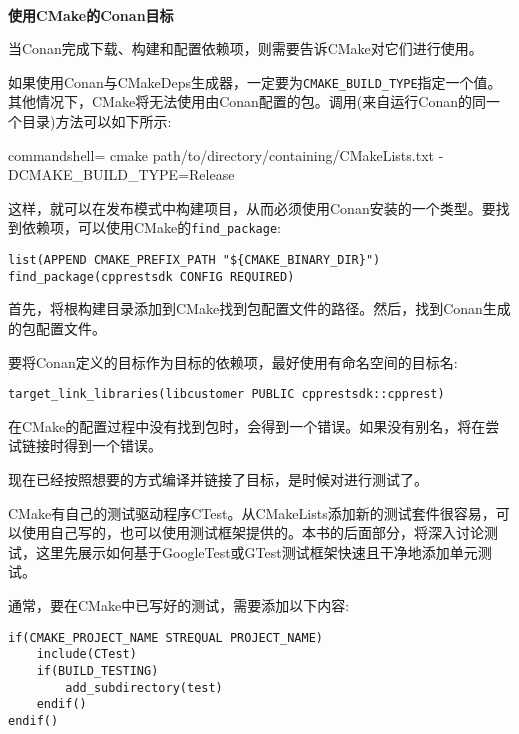 \hspace*{\fill} \\ %
\noindent
\textbf{使用CMake的Conan目标}

当Conan完成下载、构建和配置依赖项，则需要告诉CMake对它们进行使用。

如果使用Conan与CMakeDeps生成器，一定要为\texttt{CMAKE\_BUILD\_TYPE}指定一个值。其他情况下，CMake将无法使用由Conan配置的包。调用(来自运行Conan的同一个目录)方法可以如下所示:

\begin{tcblisting}{commandshell={}}
cmake path/to/directory/containing/CMakeLists.txt -DCMAKE_BUILD_TYPE=Release
\end{tcblisting}

这样，就可以在发布模式中构建项目，从而必须使用Conan安装的一个类型。要找到依赖项，可以使用CMake的\texttt{find\_package}:

\begin{lstlisting}[style=styleCMake]
list(APPEND CMAKE_PREFIX_PATH "${CMAKE_BINARY_DIR}")
find_package(cpprestsdk CONFIG REQUIRED)
\end{lstlisting}

首先，将根构建目录添加到CMake找到包配置文件的路径。然后，找到Conan生成的包配置文件。

要将Conan定义的目标作为目标的依赖项，最好使用有命名空间的目标名:

\begin{lstlisting}[style=styleCMake]
target_link_libraries(libcustomer PUBLIC cpprestsdk::cpprest)
\end{lstlisting}

在CMake的配置过程中没有找到包时，会得到一个错误。如果没有别名，将在尝试链接时得到一个错误。

现在已经按照想要的方式编译并链接了目标，是时候对进行测试了。


CMake有自己的测试驱动程序CTest。从CMakeLists添加新的测试套件很容易，可以使用自己写的，也可以使用测试框架提供的。本书的后面部分，将深入讨论测试，这里先展示如何基于GoogleTest或GTest测试框架快速且干净地添加单元测试。

通常，要在CMake中已写好的测试，需要添加以下内容:

\begin{lstlisting}[style=styleCMake]
if(CMAKE_PROJECT_NAME STREQUAL PROJECT_NAME)
	include(CTest)
	if(BUILD_TESTING)
		add_subdirectory(test)
	endif()
endif()
\end{lstlisting}

